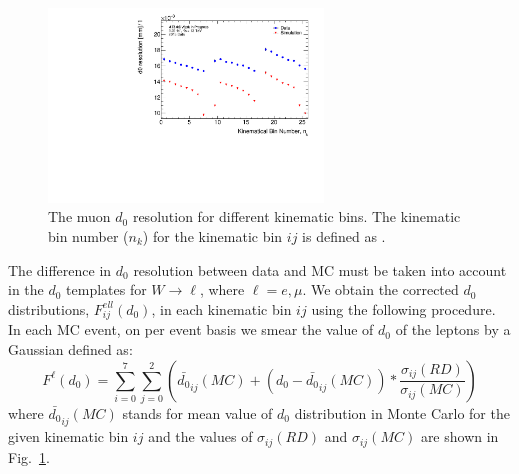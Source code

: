 \begin{figure}[htbp]
\centering
\includegraphics[width=0.65\textwidth]{figures/ZR/d0_smearing/kinematic_lep_0_trk_d0_kineticBinsResoFit-ZR-mu.pdf} %
\caption{
  The muon $d_0$ resolution for different kinematic bins. 
  The kinematic bin number ($n_k$) for the kinematic bin $ij$ is defined as .
}
\label{fig:d0_resolution}
\end{figure}

The difference in $d_0$ resolution between data and MC must be taken into account in the $d_0$ templates for $W \rightarrow \ell$, where $\ell = e, \mu$.
We obtain the corrected $d_0$ distributions, $F^{ell}_{ij}(d_0)$, in each kinematic bin $ij$ using the following procedure.
In each MC event, on per event basis we smear the value of $d_0$ of the leptons by a Gaussian defined as:
\begin{equation}
  \label{eq:d0_smearing}
  F^{\ell}(d_{0}) = \sum^{7}_{i=0} \sum^{2}_{j=0} \left( \bar{d_0}_{ij}(MC) + (d_{0} - \bar{d_0}_{ij}(MC)) * \frac{\sigma_{ij}(RD)}{\sigma_{ij}(MC)} \right)
\end{equation}
where $\bar{d_0}_{ij}(MC)$ stands for mean value of $d_0$ distribution in Monte Carlo for the given kinematic bin $ij$ and the values of $\sigma_{ij}(RD)$ and $\sigma_{ij}(MC)$ are shown in Fig.~\ref{fig:d0_resolution}.


